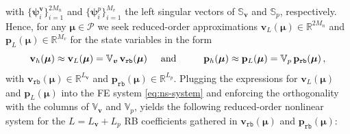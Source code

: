 \documentclass[12pt, a4paper, twoside, openright]{report}
\numberwithin{equation}{chapter}
\theoremstyle{theorem}
\theoremstyle{definition}
\theoremstyle{remark}
\theoremstyle{proposition}
\numberwithin{figure}{chapter}
\newcommand{\bg}[1]{\boldsymbol{#1}}
\begin{document}
		with $\big\lbrace \bg{\psi}_i^{\bg{v}} \big\rbrace_{i = 1}^{2 M_n}$ and $\big\lbrace \bg{\psi}_i^{p} \big\rbrace_{i = 1}^{M_v}$ the left singular vectors of $\mathbb{S}_{\bg{v}}$ and $\mathbb{S}_p$, respectively. Hence, for any $\bg{\mu} \in \mathcal{P}$ we seek reduced-order approximations $\mathbf{v}_{L}(\bg{\mu}) \in \mathbb{R}^{2 M_n}$ and $\mathbf{p}_{L}(\bg{\mu}) \in \mathbb{R}^{M_v}$ for the state variables in the form
		\begin{equation*}
			\mathbf{v}_h(\bg{\mu}) \approx \mathbf{v}_{L}(\bg{\mu}) = \mathbb{V}_{\bg{v}} \, \mathbf{v}_{\texttt{rb}}(\bg{\mu}) \hspace*{0.5cm} \text{and} \hspace*{0.5cm} \hspace*{0.5cm} \mathbf{p}_h(\bg{\mu}) \approx \mathbf{p}_{L}(\bg{\mu}) = \mathbb{V}_p \, \mathbf{p}_{\texttt{rb}}(\bg{\mu}) \, ,
		\end{equation*}
		with $\mathbf{v}_{\texttt{rb}}(\bg{\mu}) \in \mathbb{R}^{L_{\bg{v}}}$ and $\mathbf{p}_{\texttt{rb}}(\bg{\mu}) \in \mathbb{R}^{L_p}$. Plugging the expressions for $\mathbf{v}_{L}(\bg{\mu})$ and $\mathbf{p}_{L}(\bg{\mu})$ into the FE system \eqref{eq:ns-system} and enforcing the orthogonality with the columns of $\mathbb{V}_{\bg{v}}$ and $\mathbb{V}_p$, yields the following reduced-order nonlinear system for the $L = L_{\bg{v}} + L_p$ RB coefficients gathered in $\mathbf{v}_{\texttt{rb}}(\bg{\mu})$ and $\mathbf{p}_{\texttt{rb}}(\bg{\mu})$:
\end{document}
